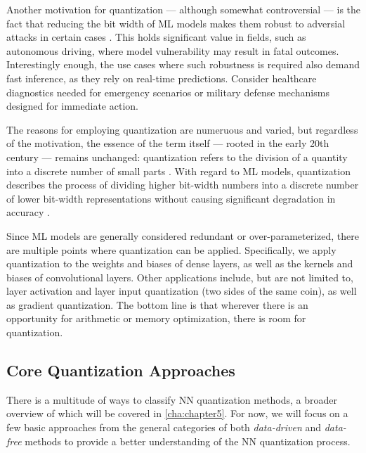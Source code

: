 Another motivation for quantization — although somewhat controversial — is the fact that reducing the bit width of
ML models makes them robust to adversial attacks in certain cases \cite{DBLP:journals/corr/abs-2404-05639}.
This holds significant value in fields, such as autonomous driving,
where model vulnerability may result in fatal outcomes.
Interestingly enough, the use cases where such robustness is required also demand fast inference, 
as they rely on real-time predictions. Consider healthcare diagnostics needed for emergency scenarios 
or military defense mechanisms designed for immediate action.

The reasons for employing quantization are numeruous and varied, but regardless of the motivation,
the essence of the term itself — rooted in the early 20th century — remains unchanged:
quantization refers to the division of a quantity into a discrete number
of small parts \cite{gray1998quantization}. With regard to ML models, 
quantization describes the process of dividing higher bit-width numbers into a discrete number of lower bit-width representations
without causing significant degradation in accuracy \cite{gholami2021survey}.

Since ML models are generally considered redundant or over-parameterized,
there are multiple points where quantization can be applied.
Specifically, we apply quantization to the weights and biases of dense layers, 
as well as the kernels and biases of convolutional layers. 
Other applications include, but are not limited to, layer activation and layer input quantization (two sides of the same coin),
as well as gradient quantization. The bottom line is that wherever there is an opportunity for arithmetic or memory optimization,
there is room for quantization.


\subsection{Core Quantization Approaches}
\label{subsec:commonquantizationapproaches}
\hspace*{1em}There is a multitude of ways to classify NN quantization methods, a broader overview of which will be covered
in \cref{cha:chapter5}.
For now, we will focus on a few basic approaches from the general categories of both 
\textit{data-driven} and \textit{data-free} methods \cite{Edouard2022SPIQ} to provide a better understanding of the NN quantization process.

